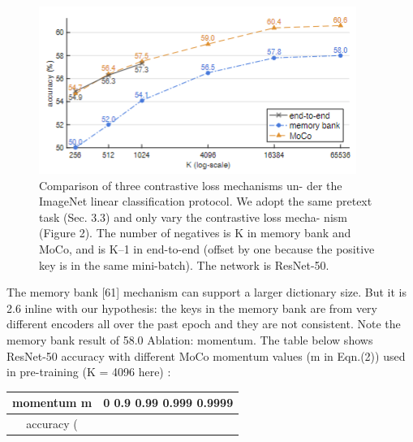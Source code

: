 \documentclass[10pt,twocolumn]{article}  %
\begin{document}
\begin{figure}[htbp]
    \centering
    \includegraphics[width=0.8\linewidth]{Pic/figure3.png} %
    \caption{ Comparison of three contrastive loss mechanisms un-
    der the ImageNet linear classiﬁcation protocol. We adopt the same
    pretext task (Sec. 3.3) and only vary the contrastive loss mecha-
    nism (Figure 2). The number of negatives is K in memory bank
    and MoCo, and is K--1 in end-to-end (offset by one because the
    positive key is in the same mini-batch). The network is ResNet-50.} %
    \label{fig:Figure 3} %
\end{figure}

The memory bank [61] mechanism can support a larger
dictionary size. But it is 2.6%
inline with our hypothesis: the keys in the memory bank
are from very different encoders all over the past epoch and
they are not consistent. Note the memory bank result of
58.0%
Ablation: momentum. The table below shows ResNet-50
accuracy with different MoCo momentum values (m in
Eqn.(2)) used in pre-training (K = 4096 here) :

\begin{table}[htbp]
    \centering
    \begin{tabular}{|c|c|} %
        \hline %
        momentum m & \multicolumn{5}{c|}{0 0.9 0.99 0.999 0.9999} \\ \hline
        accuracy (%
    \end{tabular}
    \label{tab:tab} %
\end{table}
\end{document}
